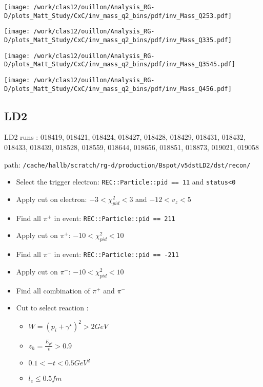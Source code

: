 \documentclass{report}
\begin{document}
    \begin{minipage}{.5\textwidth}
        \centering
        \texttt{[image: /work/clas12/ouillon/Analysis\_RG-D/plots\_Matt\_Study/CxC/inv\_mass\_q2\_bins/pdf/inv\_Mass\_Q253.pdf]}
    \end{minipage}
    \begin{minipage}{.5\textwidth}
        \centering
        \texttt{[image: /work/clas12/ouillon/Analysis\_RG-D/plots\_Matt\_Study/CxC/inv\_mass\_q2\_bins/pdf/inv\_Mass\_Q335.pdf]}
    \end{minipage}

    \begin{minipage}{.5\textwidth}
        \centering
        \texttt{[image: /work/clas12/ouillon/Analysis\_RG-D/plots\_Matt\_Study/CxC/inv\_mass\_q2\_bins/pdf/inv\_Mass\_Q3545.pdf]}
    \end{minipage}
    \begin{minipage}{.5\textwidth}
        \centering
        \texttt{[image: /work/clas12/ouillon/Analysis\_RG-D/plots\_Matt\_Study/CxC/inv\_mass\_q2\_bins/pdf/inv\_Mass\_Q456.pdf]}
    \end{minipage}


    \subsection{LD2}
    LD2 runs : 018419, 018421, 018424, 018427, 018428, 018429, 018431, 018432, 018433, 018439, 018528, 018559, 018644, 018656, 018851, 018873, 019021, 019058
    
    path: \texttt{/cache/hallb/scratch/rg-d/production/Bspot/v5dstLD2/dst/recon/}
    \begin{itemize}
        \item Select the trigger electron: \texttt{REC::Particle::pid == 11} and \texttt{status<0}
        \item Apply cut on electron: \(-3 < \chi^2_{pid} < 3\) and \(-12 < v_z < 5\)
        \item Find all \(\pi^+\) in event: \texttt{REC::Particle::pid == 211}
        \item Apply cut on \(\pi^+\): \(-10 < \chi^2_{pid} < 10\) 
        \item Find all \(\pi^-\) in event: \texttt{REC::Particle::pid == -211}
        \item Apply cut on \(\pi^-\): \(-10 < \chi^2_{pid} < 10\) 
        \item Find all combination of \(\pi^+\) and \(\pi^-\)
        \item Cut to select reaction : 
        \begin{itemize}
            \item \(W = (p_i + \gamma^{\star})^2 > 2GeV\)
            \item \(z_h = \frac{E_{\rho^0}}{v}> 0.9\)
            \item \( 0.1 < -t < 0.5 GeV^2\)
            \item \(l_c \le 0.5 fm\)
        \end{itemize} 
    \end{itemize}
\end{document}
